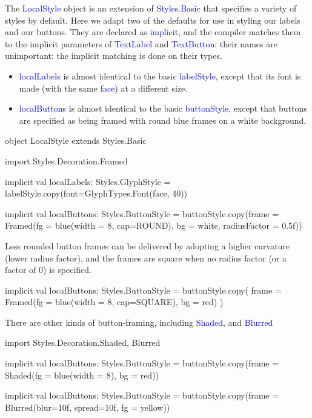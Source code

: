 \documentclass[12pt,a4paper]{article}
\def\Scala#1{\textcolor{blue}{\textsf{#1}}}
\begin{document}
The \Scala{LocalStyle} object is an extension of \Scala{Styles.Basic} that
specifies a variety of styles by default. Here we adapt two of the
defaults for use in styling our labels and our buttons. They are
declared as \Scala{implicit}, and the compiler matches them to
the implicit parameters of \Scala{TextLabel} and \Scala{TextButton}: their
names are unimportant: the implicit matching is done on their types.

\begin{itemize}
\item \Scala{localLabels} is almost identical to the basic \Scala{labelStyle},
except that its font is made (with the same \Scala{face}) at a different size.

\item \Scala{localButtons} is almost identical to the basic \Scala{buttonStyle},
except that buttons are specified as being framed with round blue frames
on a white background. 
\end{itemize}

\begin{scala}
  object LocalStyle extends Styles.Basic {
    import Styles.Decoration.Framed
    
    implicit val localLabels: Styles.GlyphStyle =
      labelStyle.copy(font=GlyphTypes.Font(face, 40))
    }

    implicit val localButtons: Styles.ButtonStyle =
      buttonStyle.copy(frame =
        Framed(fg = blue(width = 8, cap=ROUND),
               bg = white,
               radiusFactor = 0.5f))
\end{scala}

\clearpage
Less rounded button frames can be delivered by adopting a higher curvature
(lower radius factor), and the frames are square when no radius factor (or a factor of $0$)
is specified.

\begin{scala}
  implicit val localButtons: Styles.ButtonStyle =
    buttonStyle.copy(
       frame = Framed(fg = blue(width = 8, cap=SQUARE), bg = red)
    )
\end{scala}

\begin{center}
\end{center}

There are other kinds of button-framing, including \Scala{Shaded}, and \Scala{Blurred}

\begin{scala}
  import Styles.Decoration.{Shaded, Blurred}
  
  implicit val localButtons: Styles.ButtonStyle =
    buttonStyle.copy(frame = Shaded(fg = blue(width = 8), bg = red))

  implicit val localButtons: Styles.ButtonStyle =
    buttonStyle.copy(frame = Blurred(blur=10f, spread=10f, fg = yellow))
\end{scala}
\end{document}
